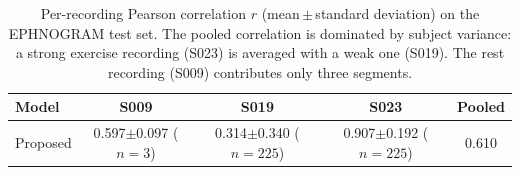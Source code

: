 \begin{table}[t]
\centering
\caption{Per-recording Pearson correlation $r$ (mean\,$\pm$\,standard deviation) on the EPHNOGRAM test set. The pooled correlation is dominated by subject variance: a strong exercise recording (S023) is averaged with a weak one (S019). The rest recording (S009) contributes only three segments.}
\label{tab:persubject_corr}
\setlength{\tabcolsep}{5pt}
\begin{tabular}{lcccc}
\toprule
Model & S009 & S019 & S023 & Pooled \\
\midrule
Proposed & 0.597$\pm$0.097 ($n{=}3$) & 0.314$\pm$0.340 ($n{=}225$) & 0.907$\pm$0.192 ($n{=}225$) & 0.610 \\
\bottomrule
\end{tabular}
\end{table}

